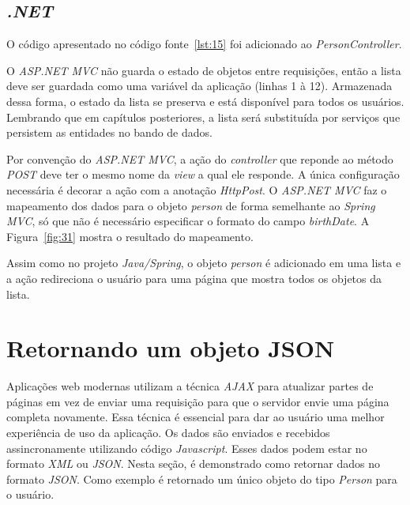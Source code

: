 \subsection{\textit{.NET}}

O código apresentado no código fonte~\ref{lst:15} foi adicionado ao \textit{PersonController}.


O \textit{ASP.NET MVC} não guarda o estado de objetos entre requisições, então a lista deve ser guardada como uma variável da aplicação (linhas 1 à 12). Armazenada dessa forma, o estado da lista se preserva e está disponível para todos os usuários. Lembrando que em capítulos posteriores, a lista será substituída por serviços que persistem as entidades no bando de dados.

Por convenção do \textit{ASP.NET MVC}, a ação do \textit{controller} que reponde ao método \textit{POST} deve ter o mesmo nome da \textit{view} a qual ele responde.  A única configuração necessária é decorar a ação com a anotação \textit{HttpPost}. O \textit{ASP.NET MVC} faz o mapeamento dos dados para o objeto \textit{person} de forma semelhante ao \textit{Spring MVC}, só que não é necessário especificar o formato do campo \textit{birthDate}. A Figura~\ref{fig:31} mostra o resultado do mapeamento.


Assim como no projeto \textit{Java/Spring}, o objeto \textit{person} é adicionado em uma lista e a ação redireciona o usuário para uma página que mostra todos os objetos da lista.

\section{Retornando um objeto JSON}

Aplicações web modernas utilizam a técnica \textit{AJAX} para atualizar partes de páginas em vez de enviar uma requisição para que o servidor envie uma página completa novamente. Essa técnica é essencial para dar ao usuário uma melhor experiência de uso da aplicação. Os dados são enviados e recebidos assincronamente utilizando código \textit{Javascript}. Esses dados podem estar no formato \textit{XML} ou \textit{JSON}. Nesta seção, é demonstrado como retornar dados no formato \textit{JSON}. Como exemplo é retornado um único objeto do tipo \textit{Person} para o usuário.

